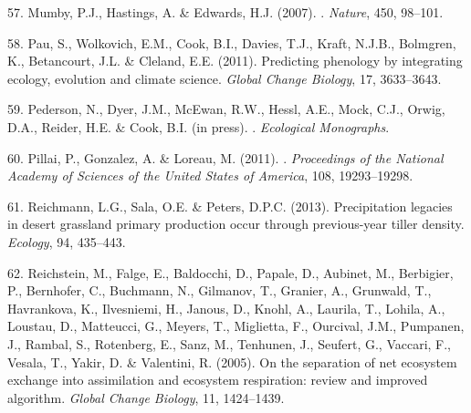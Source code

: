 \documentclass[11pt,a4paper,oneside]{article}
\begin{document}
\begin{thebibliography}{79}
57. Mumby, P.J., Hastings, A. \& Edwards, H.J. (2007).
.
\newblock \emph{Nature}, 450, 98--101.

58. Pau, S., Wolkovich, E.M., Cook, B.I., Davies, T.J., Kraft, N.J.B., Bolmgren,
  K., Betancourt, J.L. \& Cleland, E.E. (2011).
\newblock Predicting phenology by integrating ecology, evolution and climate
  science.
\newblock \emph{Global Change Biology}, 17, 3633--3643.

59. Pederson, N., Dyer, J.M., McEwan, R.W., Hessl, A.E., Mock, C.J., Orwig, D.A.,
  Reider, H.E. \& Cook, B.I. (in press).
.
\newblock \emph{Ecological Monographs}.

60. Pillai, P., Gonzalez, A. \& Loreau, M. ({2011}).
.
\newblock \emph{Proceedings of the National Academy of Sciences of the United
  States of America}, {108}, {19293--19298}.

61. Reichmann, L.G., Sala, O.E. \& Peters, D.P.C. (2013).
\newblock Precipitation legacies in desert grassland primary production occur
  through previous-year tiller density.
\newblock \emph{Ecology}, 94, 435--443.

62. Reichstein, M., Falge, E., Baldocchi, D., Papale, D., Aubinet, M., Berbigier,
  P., Bernhofer, C., Buchmann, N., Gilmanov, T., Granier, A., Grunwald, T.,
  Havrankova, K., Ilvesniemi, H., Janous, D., Knohl, A., Laurila, T., Lohila,
  A., Loustau, D., Matteucci, G., Meyers, T., Miglietta, F., Ourcival, J.M.,
  Pumpanen, J., Rambal, S., Rotenberg, E., Sanz, M., Tenhunen, J., Seufert, G.,
  Vaccari, F., Vesala, T., Yakir, D. \& Valentini, R. (2005).
\newblock On the separation of net ecosystem exchange into assimilation and
  ecosystem respiration: review and improved algorithm.
\newblock \emph{Global Change Biology}, 11, 1424--1439.


\end{thebibliography}
\end{document}
